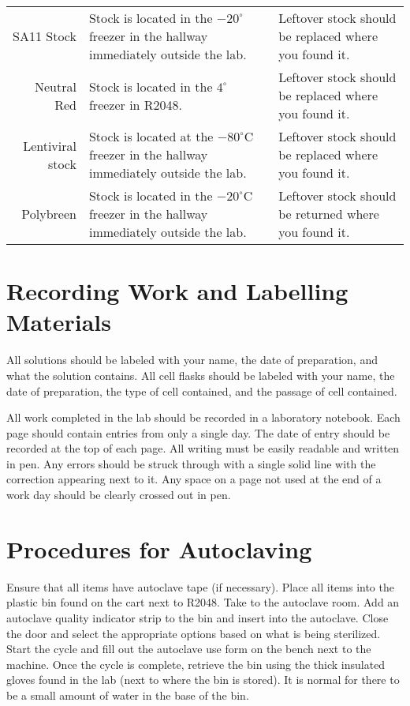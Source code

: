 \begin{tabular*}{\textwidth}{r | p{2in} p{2in}}
SA11 Stock & Stock is located in the $-20^{\circ}$ freezer in the hallway immediately outside the lab. & Leftover stock should be replaced where you found it.\\
Neutral Red & Stock is located in the $4^{\circ}$ freezer in R2048. & Leftover stock should be replaced where you found it.\\
Lentiviral stock & Stock is located at the $-80^{\circ}$C freezer in the hallway immediately outside the lab. & Leftover stock should be replaced where you found it. \\
Polybreen & Stock is located in the $-20^{\circ}$C freezer in the hallway immediately outside the lab. & Leftover stock should be returned where you found it.\\
\hline
\end{tabular*}

\section{Recording Work and Labelling Materials}

All solutions should be labeled with your name, the date of preparation, and what the solution contains. All cell flasks should be labeled with your name, the date of preparation, the type of cell contained, and the passage of cell contained.

All work completed in the lab should be recorded in a laboratory notebook. Each page should contain entries from only a single day. The date of entry should be recorded at the top of each page. All writing must be easily readable and written in pen. Any errors should be struck through with a single solid line with the correction appearing next to it. Any space on a page not used at the end of a work day should be clearly crossed out in pen.

\section{Procedures for Autoclaving}

Ensure that all items have autoclave tape (if necessary). Place all items into the plastic bin found on the cart next to R2048. Take to the autoclave room. Add an autoclave quality indicator strip to the bin and insert into the autoclave. Close the door and select the appropriate options based on what is being sterilized. Start the cycle and fill out the autoclave use form on the bench next to the machine. Once the cycle is complete, retrieve the bin using the thick insulated gloves found in the lab (next to where the bin is stored). It is normal for there to be a small amount of water in the base of the bin.

